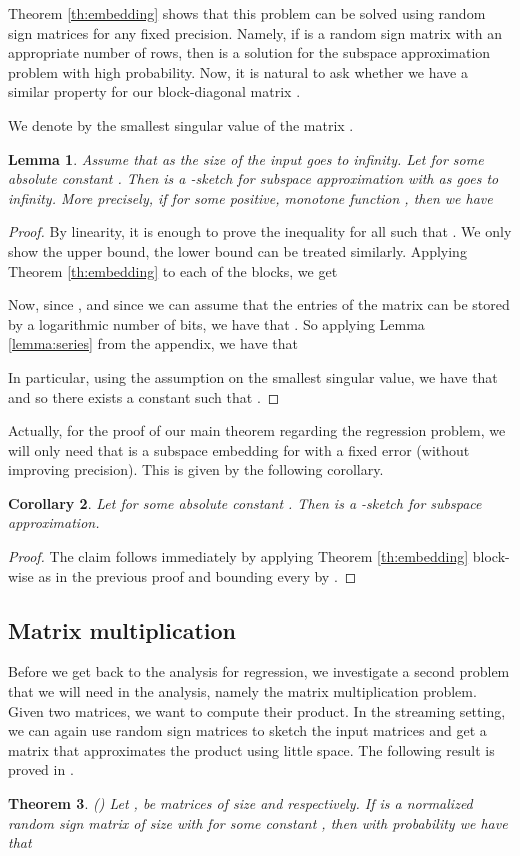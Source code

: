 \documentclass[a4paper,11pt,oneside,english,onecolumn]{article}
\newtheorem{theorem}{Theorem}
\newtheorem{lemma}[theorem]{Lemma}
\newtheorem{corollary}[theorem]{Corollary}
\theoremstyle{definition}
\begin{document}
Theorem \ref{th:embedding} shows that this problem can be solved using random sign matrices for any fixed precision. Namely, if  is a random sign matrix with an appropriate number of rows, then  is a solution for the subspace approximation problem with high probability. Now, it is natural to ask whether we have a  similar property for our block-diagonal matrix .

We denote by  the smallest singular value of the matrix .
\begin{lemma}
\label{lemma:improvedSubspaceEmbedding}
Assume that  as the size of the input goes to infinity. Let  for some absolute constant . Then  is a -sketch for subspace approximation with  as  goes to infinity. More precisely, if  for some positive, monotone function , then we have 
\end{lemma}
\begin{proof}
By linearity, it is enough to prove the inequality for all  such that . We only show the upper bound, the lower bound can be treated similarly. Applying Theorem \ref{th:embedding} to each of the blocks, we get

Now, since , and since we can assume that the entries of the matrix can be stored by a logarithmic number of bits, we have that . So applying Lemma \ref{lemma:series} from the appendix, we have that

In particular, using the assumption on the smallest singular value, we have that  and so there exists a constant  such that
.
\end{proof}

 Actually, for the proof of our main theorem regarding the regression problem, we will only need that  is a subspace embedding for  with a fixed error  (without improving precision). This is given by the following corollary. 
\begin{corollary}
\label{corollary:simpleSubspaceEmbedding}
Let  for some absolute constant . Then  is a -sketch for subspace approximation.
\end{corollary}
\begin{proof}
The claim follows immediately by applying Theorem \ref{th:embedding} block-wise as in the previous proof and bounding every  by .
\end{proof}

\subsection{Matrix multiplication}
Before we get back to the analysis for regression, we investigate a second problem that we will need in the analysis, namely the matrix multiplication problem. Given two matrices, we want to compute their product. In the streaming setting, we can again use random sign matrices to sketch the input matrices and get a matrix that approximates the product using little space. The following result is proved in \cite{LinAlgStream}.
\begin{theorem}
\label{th:matrixMultiplication}(\cite{LinAlgStream})
Let ,  be matrices of size  and  respectively. If  is a normalized random sign matrix of size  with  for some constant , then with probability  we have that 
\end{theorem}
\end{document}
